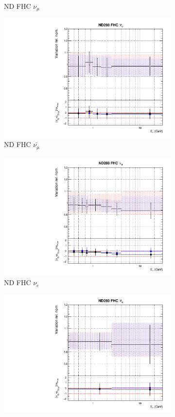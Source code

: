 \begin{figure}[t]
\begin{subfigure}{0.42\textwidth}
  \caption{ND FHC $\nu_{\mu}$}
\end{subfigure}
\begin{subfigure}{0.42\textwidth}
  \centering
  \includegraphics[width=0.75\linewidth]{figs/rhcmpasmvflux1}
  \caption{ND FHC $\bar{\nu_{\mu}}$}
\end{subfigure}
\begin{subfigure}{0.42\textwidth}
  \centering
  \includegraphics[width=0.75\linewidth]{figs/rhcmpasmvflux2}
  \caption{ND FHC $\nu_e$}
\end{subfigure}
\begin{subfigure}{0.42\textwidth}
  \centering
  \includegraphics[width=0.75\linewidth]{figs/rhcmpasmvflux3}

\end{subfigure}
\end{figure}
